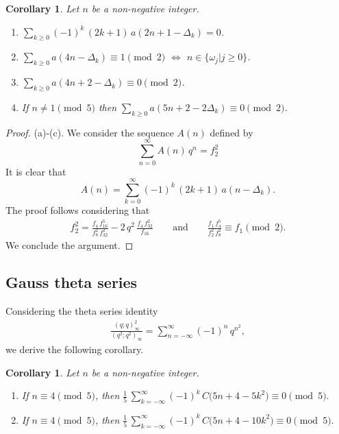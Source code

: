 \documentclass{article}
\newtheorem{corollary}[theorem]{Corollary}
\begin{document}
\medskip
\begin{corollary} \label{Cor6} Let $n$ be a non-negative integer.
\begin{enumerate}
    \item [(a)] $\sum\limits_{k\geq0} (-1)^k\, (2k+1)\, a(2n+1-\Delta_k) = 0$.
    \item [(b)] $\sum\limits_{k\geq0}a(4n-\Delta_k) \equiv 1 \pmod 2$   $\iff$  $n\in\{\omega_j\vert j\geq0\}$.
    \item [(c)] $\sum\limits_{k\geq0} a(4n+2-\Delta_k)\equiv 0 \pmod 2$.
    \item [(d)] If $n\neq 1\pmod5$  then  $\sum\limits_{k\geq0} a(5n+2-2\Delta_k) \equiv 0 \pmod 2$.
\end{enumerate}
\end{corollary}
\medskip


\begin{proof}

	(a)-(c). We consider the sequence $A(n)$ defined by
	$$
	\sum_{n=0}^\infty A(n)\,q^n = f_2^2
	$$
	It is clear that
	$$
	A(n)=\sum_{k=0}^\infty (-1)^k\,(2k+1)\, a\left(n-\Delta_k\right).
	$$
	The proof follows considering that
	\begin{align*}
	f_2^2 = \frac{f_4\,f_{16}^5}{f_8^2\,f_{32}^2} - 2\,q^2\,\frac{f_4\,f_{32}^2}{f_{16}} \qquad \text{and} \qquad
   \frac{f_1\,f_{4}^5}{f_2^2\,f_{8}^2} \equiv f_1 \pmod 2.
	\end{align*}
	We conclude the argument.
\end{proof}


\subsection{Gauss theta series}

Considering the theta series identity \cite[Eq. (0.41), p. 16]{Cooper}
\begin{align*}
\frac{(q;q)_\infty^2}{(q^2;q^2)_\infty} =  \sum_{n=-\infty}^\infty (-1)^n\,q^{n^2},
\end{align*}
we derive the following corollary.

\medskip
\begin{corollary} 
	Let $n$ be a non-negative integer.
	\begin{enumerate}
		\item [(a)]	If $n\equiv 4 \pmod 5$, then
		$
		\frac{1}{5}\,\sum\limits_{k=-\infty}^\infty (-1)^k\,C\big(5n+4-5k^2\big)  \equiv 0 \pmod 5.
		$
				\item [(b)]	If $n\equiv 4 \pmod 5$, then
		$
		\frac{1}{5}\,\sum\limits_{k=-\infty}^\infty (-1)^k\,C\big(5n+4-10k^2\big)  \equiv 0 \pmod 5.
		$
	\end{enumerate}
\end{corollary}
\medskip
\end{document}
